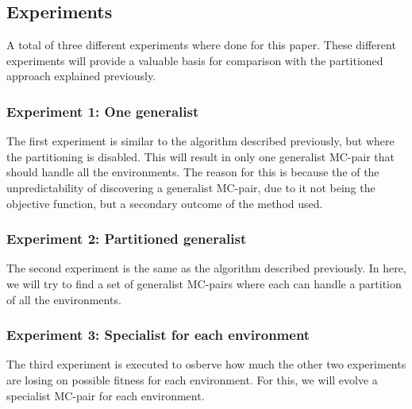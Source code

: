     \subsection{Experiments}
        A total of three different experiments where done for this paper. These different experiments will provide a valuable basis for comparison with the partitioned approach explained previously.
        \subsubsection{Experiment 1: One generalist}
            The first experiment is similar to the algorithm described previously, but where the partitioning is disabled. This will result in only one generalist MC-pair that should handle all the environments. The reason for this is because the of the unpredictability of discovering a generalist MC-pair, due to it not being the objective function, but a secondary outcome of the method used.
        \subsubsection{Experiment 2: Partitioned generalist}
            The second experiment is the same as the algorithm described previously. In here, we will try to find a set of generalist MC-pairs where each can handle a partition of all the environments. 
        \subsubsection{Experiment 3: Specialist for each environment}
            The third experiment is executed to osberve how much the other two experiments are losing on possible fitness for each environment. For this, we will evolve a specialist MC-pair for each environment.